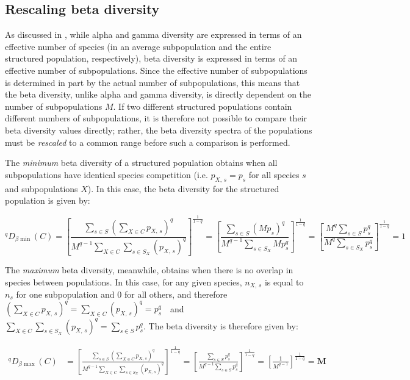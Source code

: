 \subsection{Rescaling beta diversity}
\label{app:diversity-structured-rescaling}

As discussed in , while alpha  and gamma diversity are expressed in terms of an effective number of species (in an average subpopulation and the entire structured population, respectively), beta diversity is expressed in terms of an effective number of subpopulations. Since the effective number of subpopulations is determined in part by the actual number of subpopulations, this means that the beta diversity, unlike alpha and gamma diversity, is directly dependent on the number of subpopulations $M$. If two different structured populations contain different numbers of subpopulations, it is therefore not possible to compare their beta diversity values directly; rather, the beta diversity spectra of the populations must be \textit{rescaled} to a common range before such a comparison is performed.

The \textit{minimum} beta diversity of a structured population obtains when all subpopulations have identical species competition (i.e. $p_{X,\,s} = p_{s}$ for all species $s$ and subpopulations $X$). In this case, the beta diversity for the structured population is given by:

\begin{equation}
^qD_{\beta\min}(C) = \left[
\frac{\displaystyle\sum_{s \in S}\left(\sum_{X \in C} p_{X,\,s}\right)^q}{\displaystyle M^{q-1} \sum_{X \in C}\sum_{s \in S_X} (p_{X,\,s})^q}
\right]^\frac{1}{1-q}
= \left[
\frac{\displaystyle\sum_{s \in S}\left(Mp_s\right)^q}{\displaystyle M^{q-1}\sum_{s \in S_X} Mp_s^q}
\right]^\frac{1}{1-q}
= \left[
\frac{M^q\displaystyle\sum_{s \in S}p_s^q}{M^q\displaystyle\sum_{s \in S_X} p_s^q}
\right]^\frac{1}{1-q} = 1
\label{eq:diversity_beta_min}
\end{equation}

\noindent The \textit{maximum} beta diversity, meanwhile, obtains when there is no overlap in species between populations. In this case, for any given species, $n_{X,\,s}$ is equal to $n_s$ for one subpopulation and $0$ for all others, and therefore $\left(\sum_{X \in C} p_{X,\,s}\right)^q = \sum_{X \in C} (p_{X,\,s})^q = p_s^q$~~and~~$\sum_{X \in C}\sum_{s \in S_X} (p_{X,\,s})^q = \sum_{s \in S} p_s^q$. The beta diversity is therefore given by:

\begin{equation}\begin{split}
^qD_{\beta\max}(C) &
= \left[\frac{\displaystyle\sum_{s \in S}\left(\sum_{X \in C} p_{X,\,s}\right)^q}{\displaystyle M^{q-1} \sum_{X \in C}\sum_{s \in S_X} (p_{X,\,s})^q}\right]^\frac{1}{1-q}
= \left[\frac{\displaystyle\sum_{s \in S} p_s^q}{\displaystyle M^{q-1} \sum_{s \in S} p_s^q}\right]^\frac{1}{1-q}
= \left[\frac{1}{M^{q-1}}\right]^\frac{1}{1-q} = \boldsymbol{M}
\end{split}
\label{eq:diversity_beta_max}
\end{equation}


